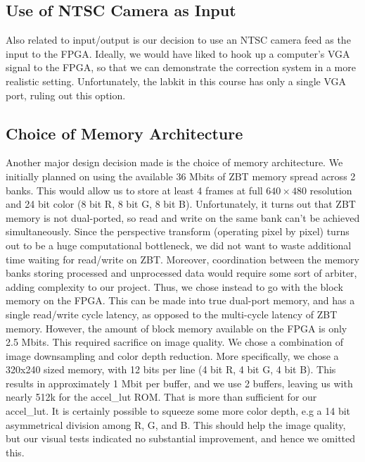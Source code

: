 \documentclass{article}
\begin{document}
\subsection{Use of NTSC Camera as Input}
Also related to input/output is our decision to use an NTSC camera feed as the input to the FPGA.
Ideally, we would have liked to hook up a computer's VGA signal to the FPGA, so that we can demonstrate the correction system in a more realistic setting.
Unfortunately, the labkit in this course has only a single VGA port, ruling out this option.

\subsection{Choice of Memory Architecture}
Another major design decision made is the choice of memory architecture.
We initially planned on using the available 36 Mbits of ZBT memory spread across 2 banks.
This would allow us to store at least 4 frames at full $640 \times 480$  resolution and 24 bit color (8 bit R, 8 bit G, 8 bit B).
Unfortunately, it turns out that ZBT memory is not dual-ported, so read and write on the same bank can't be achieved simultaneously.
Since the perspective transform (operating pixel by pixel) turns out to be a huge computational bottleneck,
we did not want to waste additional time waiting for read/write on ZBT.
Moreover, coordination between the memory banks storing processed and unprocessed data would require some sort of arbiter, adding complexity to our project.
Thus, we chose instead to go with the block memory on the FPGA.
This can be made into true dual-port memory, and has a single read/write cycle latency, as opposed to the multi-cycle latency of ZBT memory.
However, the amount of block memory available on the FPGA is only 2.5 Mbits.
This required sacrifice on image quality.
We chose a combination of image downsampling and color depth reduction.
More specifically, we chose a 320x240 sized memory, with 12 bits per line (4 bit R, 4 bit G, 4 bit B).
This results in approximately 1 Mbit per buffer, and we use 2 buffers, leaving us with nearly 512k for the accel\_lut ROM.
That is more than sufficient for our accel\_lut.
It is certainly possible to squeeze some more color depth, e.g a 14 bit asymmetrical division among R, G, and B.
This should help the image quality, but our visual tests indicated no substantial improvement, and hence we omitted this.
\end{document}
